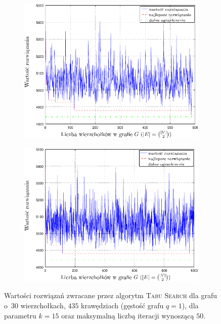 \begin{figure}[!h]
	\renewcommand\figurename{Wykres}
	\null\hfill
	\begin{subfigure}[b]{0.45\textwidth}
		\includegraphics[width=\textwidth]{Chapter_VI/RRIMST10-example/RRIMST10_psfrag}
		\caption{}
		\label{fig:rrimst4:a}
	\end{subfigure}
	\hfill
	\begin{subfigure}[b]{0.45\textwidth}
		\includegraphics[width=\textwidth]{Chapter_VI/RRIMST11-example/RRIMST11_psfrag}
		\caption{}
		\label{fig:rrimst4:b}
	\end{subfigure}
	\hfill\null
	\caption{
		Wartości rozwiązań zwracane przez algorytm \textsc{Tabu Search} dla grafu o~$30$ wierzchołkach, $435$ krawędziach (gęstość grafu $q = 1$), dla parametru $k = 15$ oraz maksymalną liczbą iteracji wynoszącą $50$.
}
\end{figure}
